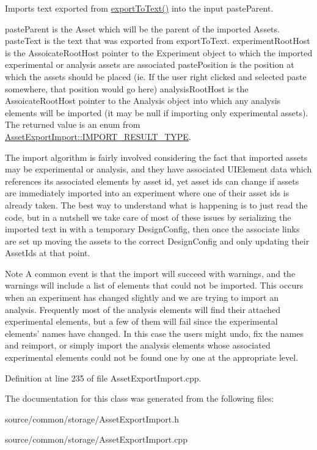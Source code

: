 Imports text exported from \hyperlink{class_asset_export_import_a164a5810ba088a4577ecb5e7b81a12ef}{export\-To\-Text()} into the input paste\-Parent. 

paste\-Parent is the Asset which will be the parent of the imported Assets. paste\-Text is the text that was exported from export\-To\-Text. experiment\-Root\-Host is the Assoicate\-Root\-Host pointer to the Experiment object to which the imported experimental or analysis assets are associated paste\-Position is the position at which the assets should be placed (ie. If the user right clicked and selected paste somewhere, that position would go here) analysis\-Root\-Host is the Assoicate\-Root\-Host pointer to the Analysis object into which any analysis elements will be imported (it may be null if importing only experimental assets). The returned value is an enum from \hyperlink{class_asset_export_import_aca4cd77d57caadb60bc50edc33ca3d9e}{Asset\-Export\-Import\-::\-I\-M\-P\-O\-R\-T\-\_\-\-R\-E\-S\-U\-L\-T\-\_\-\-T\-Y\-P\-E}.

The import algorithm is fairly involved considering the fact that imported assets may be experimental or analysis, and they have associated U\-I\-Element data which references its associated elements by asset id, yet asset ids can change if assets are immediately imported into an experiment where one of their asset ids is already taken. The best way to understand what is happening is to just read the code, but in a nutshell we take care of most of these issues by serializing the imported text in with a temporary Design\-Config, then once the associate links are set up moving the assets to the correct Design\-Config and only updating their Asset\-Ids at that point. \begin{DoxyNote}{Note}
A common event is that the import will succeed with warnings, and the warnings will include a list of elements that could not be imported. This occurs when an experiment has changed slightly and we are trying to import an analysis. Frequently most of the analysis elements will find their attached experimental elements, but a few of them will fail since the experimental elements' names have changed. In this case the users might undo, fix the names and reimport, or simply import the analysis elements whose associated experimental elements could not be found one by one at the appropriate level. 
\end{DoxyNote}


Definition at line 235 of file Asset\-Export\-Import.\-cpp.



The documentation for this class was generated from the following files\-:\begin{DoxyCompactItemize}
\item 
source/common/storage/Asset\-Export\-Import.\-h\item 
source/common/storage/Asset\-Export\-Import.\-cpp\end{DoxyCompactItemize}
